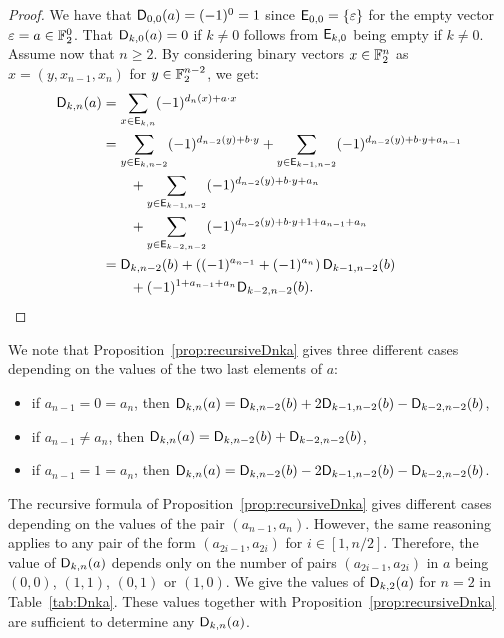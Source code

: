 \documentclass{llncs}
\begin{document}
\begin{proof}
    We have that $\Dnka 00a=(-1)^0=1$ since $\Ekn 00=\{\varepsilon\}$ for the empty vector $\varepsilon=a\in\F_2^0$. That $\Dnka 0ka=0$ if $k\neq 0$ follows from $\Ekn k0$ being empty if $k\neq 0$. Assume now that $n\geq 2$. By considering binary vectors $x\in\F_2^n$ as $x=(y,x_{n-1},x_n)$ for $y\in\F_2^{n-2}$, we get:
    \begin{align*}
		\Dnka{n}{k}{a}&=\sum_{x\in \Ekn{k}{n}} (-1)^{d_n(x) +a\cdot x}\\
		&=\sum_{y\in \Ekn{k}{n-2}} (-1)^{d_{n-2}(y) +b\cdot y}+
		\sum_{y\in \Ekn{k-1}{n-2}} (-1)^{d_{n-2}(y) +b\cdot y + a_{n-1}}\\
		&\qquad+\sum_{y\in \Ekn{k-1}{n-2}} (-1)^{d_{n-2}(y) +b\cdot y + a_{n}}\\
		&\qquad+\sum_{y\in \Ekn{k-2}{n-2}} (-1)^{d_{n-2}(y) +b\cdot y +1 + a_{n-1}+ a_{n}}\\
		&=\Dnka{n-2}{k}{b}+\left((-1)^{a_{n-1}}+ (-1)^{a_{n}}\right)\Dnka{n-2}{k-1}{b}\\
		&\qquad+ (-1)^{1+a_{n-1}+a_n} \Dnka{n-2}{k-2}{b}.\qedhere
    \end{align*}
\end{proof}

\begin{remark}
    We note that Proposition~\ref{prop:recursiveDnka} gives three different cases depending on the values of the two last elements of $a$:%
	\begin{itemize}
		\item if $a_{n-1}=0=a_n$, then $\Dnka{n}{k}{a}=\Dnka{n-2}{k}{b}+2\Dnka{n-2}{k-1}{b}-\Dnka{n-2}{k-2}{b}$,
		\item if $a_{n-1} \ne a_n$, then $\Dnka{n}{k}{a}=\Dnka{n-2}{k}{b}+\Dnka{n-2}{k-2}{b}$,
		\item if $a_{n-1}=1=a_n$, then $\Dnka{n}{k}{a}=\Dnka{n-2}{k}{b}-2\Dnka{n-2}{k-1}{b}-\Dnka{n-2}{k-2}{b}$.
	\end{itemize}
\end{remark}

\begin{remark}\label{rmk:dependence_dnka}
    The recursive formula of Proposition~\ref{prop:recursiveDnka} gives different cases depending on the values of the pair $(a_{n-1},a_n)$. However, the same reasoning applies to any pair of the form $(a_{2i-1}, a_{2i})$ for $i\in[1,n/2]$. Therefore, the value of $\Dnka{n}{k}{a}$ depends only on the number of pairs $(a_{2i-1}, a_{2i})$ in $a$ being $(0,0)$, $(1,1)$, $(0,1)$ or $(1,0)$. We give the values of $\Dnka{2}{k}{a}$ for $n=2$ in Table~\ref{tab:Dnka}. These values together with Proposition~\ref{prop:recursiveDnka} are sufficient to determine any $\Dnka{n}{k}{a}$.
\end{remark}
\end{document}

